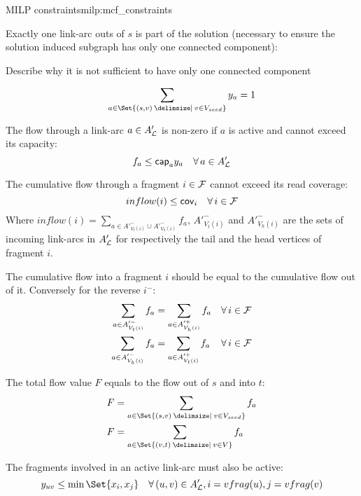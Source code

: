 \begin{definition}{\MCF{} MILP constraints}{milp:mcf_constraints}

    Exactly one link-arc outs of \(s\) is part of the solution (necessary to ensure the solution induced subgraph has only one connected component):
    \begin{todobox}
        Describe why it is not sufficient to have only one connected component
    \end{todobox}
    \begin{equation}
        \sum_{a \in \Set{(s, v) \given v \in \VSeed{}}} y_a = 1
    \end{equation}
    
    The flow through a link-arc \(a \in A'_{\mathcal{L}}{}\) is non-zero if \(a\) is active and cannot exceed its capacity: 
    \begin{equation}
        f_a \leq \capacity{a} y_a \quad \forall a \in A'_\Links{}
    \end{equation}

    The cumulative flow through a fragment \(i \in \mathcal{F}{}\) cannot exceed its read coverage:
    \begin{equation}
        inflow(i) \leq \cov{i} \quad \forall i \in \Fragments{}
    \end{equation} 
    Where \(\displaystyle inflow(i) = \sum_{a \in A'^-_{V_t(i)} \cup A'^-_{V_h(i)}} f_a\), \(A'^-_{V_t(i)}\) and \(A'^-_{V_h(i)}\) are the sets of incoming link-arcs in \(A'_{\mathcal{L}}{}\) for respectively the tail and the head vertices of fragment \(i\).

    The cumulative flow into a fragment \(i\) should be equal to the cumulative flow out of it. Conversely for the reverse \(i^-\):
    \begin{align}
        \sum_{a \in A'^-_{V_t(i)}} f_a & = \sum_{a \in A'^+_{V_h(i)}} f_a & \forall i \in \Fragments{} \\
        \sum_{a \in A'^-_{V_h(i)}} f_a & = \sum_{a \in A'^+_{V_t(i)}} f_a & \forall i \in \Fragments{}
    \end{align}

    The total flow value \(F\) equals to the flow out of \(s\) and into \(t\):
    \begin{align}
        F & = \sum_{a \in \Set{(s, v) \given v \in \VSeed{}}} f_a \\
        F & = \sum_{a \in \Set{(v, t) \given v \in V}} f_a
    \end{align}

    The fragments involved in an active link-arc must also be active:
    \begin{equation}
        y_{uv} \leq \min\Set{x_i, x_j} \quad \forall (u, v) \in A'_\Links{}, i = vfrag(u), j = vfrag(v) 
    \end{equation}


\end{definition}
